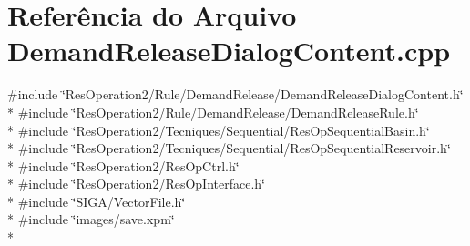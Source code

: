\section{Referência do Arquivo Demand\+Release\+Dialog\+Content.\+cpp}
\label{_demand_release_dialog_content_8cpp}
{\ttfamily \#include \char`\"{}Res\+Operation2/\+Rule/\+Demand\+Release/\+Demand\+Release\+Dialog\+Content.\+h\char`\"{}}\\*
{\ttfamily \#include \char`\"{}Res\+Operation2/\+Rule/\+Demand\+Release/\+Demand\+Release\+Rule.\+h\char`\"{}}\\*
{\ttfamily \#include \char`\"{}Res\+Operation2/\+Tecniques/\+Sequential/\+Res\+Op\+Sequential\+Basin.\+h\char`\"{}}\\*
{\ttfamily \#include \char`\"{}Res\+Operation2/\+Tecniques/\+Sequential/\+Res\+Op\+Sequential\+Reservoir.\+h\char`\"{}}\\*
{\ttfamily \#include \char`\"{}Res\+Operation2/\+Res\+Op\+Ctrl.\+h\char`\"{}}\\*
{\ttfamily \#include \char`\"{}Res\+Operation2/\+Res\+Op\+Interface.\+h\char`\"{}}\\*
{\ttfamily \#include \char`\"{}S\+I\+G\+A/\+Vector\+File.\+h\char`\"{}}\\*
{\ttfamily \#include \char`\"{}images/save.\+xpm\char`\"{}}\\*
